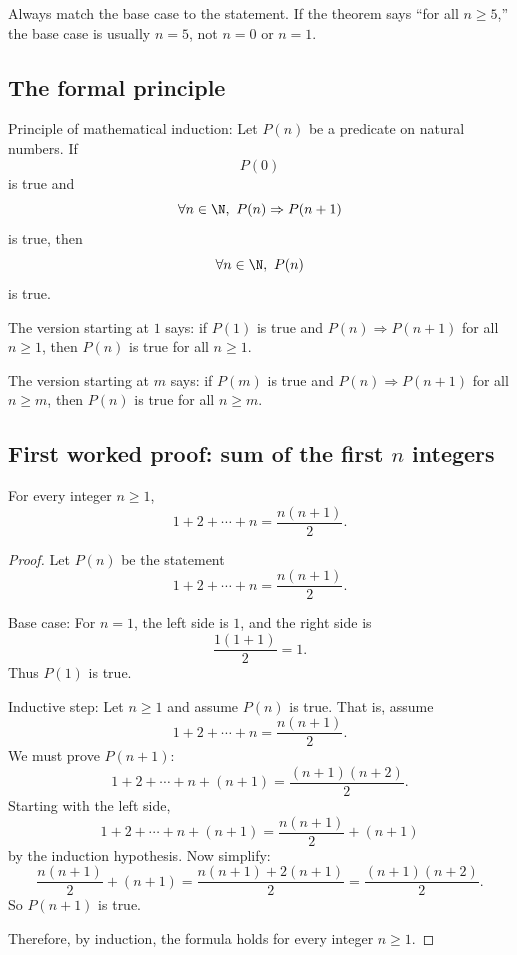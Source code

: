 \begin{trapbox}
Always match the base case to the statement. If the theorem says ``for all $n\geq 5$,'' the base case is usually $n=5$, not $n=0$ or $n=1$.
\end{trapbox}

\subsection{The formal principle}

\begin{formalbox}
Principle of mathematical induction: Let $P(n)$ be a predicate on natural numbers. If
\[
P(0)
\]
is true and
\[
\forall n\in\N,\ P(n)\Rightarrow P(n+1)
\]
is true, then
\[
\forall n\in\N,\ P(n)
\]
is true.
\end{formalbox}

The version starting at $1$ says: if $P(1)$ is true and $P(n)\Rightarrow P(n+1)$ for all $n\geq1$, then $P(n)$ is true for all $n\geq1$.

The version starting at $m$ says: if $P(m)$ is true and $P(n)\Rightarrow P(n+1)$ for all $n\geq m$, then $P(n)$ is true for all $n\geq m$.

\subsection{First worked proof: sum of the first $n$ integers}

\begin{theorem}
For every integer $n\geq1$,
\[
1+2+\cdots+n=\frac{n(n+1)}{2}.
\]
\end{theorem}

\begin{proof}
Let $P(n)$ be the statement
\[
1+2+\cdots+n=\frac{n(n+1)}{2}.
\]

Base case: For $n=1$, the left side is $1$, and the right side is
\[
\frac{1(1+1)}{2}=1.
\]
Thus $P(1)$ is true.

Inductive step: Let $n\geq1$ and assume $P(n)$ is true. That is, assume
\[
1+2+\cdots+n=\frac{n(n+1)}{2}.
\]
We must prove $P(n+1)$:
\[
1+2+\cdots+n+(n+1)=\frac{(n+1)(n+2)}{2}.
\]
Starting with the left side,
\[
1+2+\cdots+n+(n+1)
=\frac{n(n+1)}{2}+(n+1)
\]
by the induction hypothesis. Now simplify:
\[
\frac{n(n+1)}{2}+(n+1)
=\frac{n(n+1)+2(n+1)}{2}
=\frac{(n+1)(n+2)}{2}.
\]
So $P(n+1)$ is true.

Therefore, by induction, the formula holds for every integer $n\geq1$.
\end{proof}

